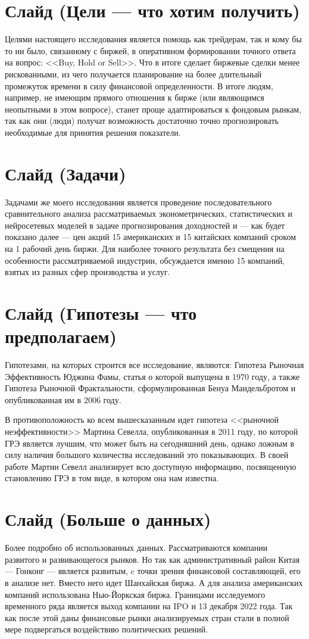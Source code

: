 \documentclass[a4paper, 12pt]{article}
\begin{document}
	\section{Слайд (Цели --- что хотим получить)}
		Целями настоящего исследования является помощь как трейдерам, так и кому бы то ни было, связанному с биржей, в оперативном формировании точного ответа на вопрос: <<Buy, Hold or Sell>>. Что в итоге сделает биржевые сделки менее рискованными, из чего получается планирование на более длительный промежуток времени в силу финансовой определенности. В итоге людям, например, не имеющим прямого отношения к бирже (или являющимся неопытными в этом вопросе), станет проще адаптироваться к фондовым рынкам, так как они (люди) получат возможность достаточно точно прогнозировать необходимые для принятия решения показатели.
	\section{Слайд (Задачи)}
		Задачами же моего исследования является проведение последовательного сравнительного анализа рассматриваемых эконометрических, статистических и нейросетевых моделей в задаче прогнозирования доходностей и --- как будет показано далее --- цен акций 15 американских и 15 китайских компаний сроком на 1 рабочий день биржи. Для наиболее точного результата без смещения на особенности рассматриваемой индустрии, обсуждается именно 15 компаний, взятых из разных сфер производства и услуг.
	\section{Слайд (Гипотезы --- что предполагаем)}
		Гипотезами, на которых строится все исследование, являются: Гипотеза Рыночная Эффективность Юджина Фамы, статья о которой выпущена в 1970 году, а также Гипотеза Рыночной Фрактальности, сформулированная Бенуа Мандельбротом и опубликованная им в 2006 году.
		
		В противоположность ко всем вышесказанным идет гипотеза <<рыночной неэффективности>> Мартина Севелла, опубликованная в 2011 году, по которой ГРЭ является лучшим, что может быть на сегодняшний день, однако ложным в силу наличия большого количества исследований это показывающих. В своей работе Мартин Севелл анализирует всю доступную информацию, посвященную становлению ГРЭ в том виде, в котором она нам известна.
	\section{Слайд (Больше о данных)}
		Более подробно об использованных данных. Рассматриваются компании развитого и развивающегося рынков. Но так как административный район Китая --- Гонконг --- является развитым, c точки зрения финансовой составляющей, его в анализе нет. Вместо него идет Шанхайская биржа. А для анализа американских компаний использована Нью-Йоркская биржа. Границами исследуемого временного ряда является выход компании на IPO и 13 декабря 2022 года. Так как после этой даны финансовые рынки анализируемых стран стали в полной мере подвергаться воздействию политических решений.
		
\end{document}
